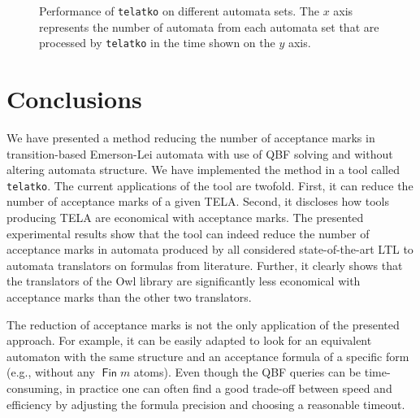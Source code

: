 \documentclass[a4paper,UKenglish,cleveref,autoref,thm-restate]{lipics-v2021}
\newcommand{\todo}[1]{\marginpar{\textcolor{red}{#1}}}
\DeclareMathOperator{\Fin}{\mathsf{Fin}}
\newcommand{\telatko}{\texttt{telatko}\xspace}
\begin{document}
\todo{popisek Fig. 3 neni hezky. Je to wall time nebo CPU time? Je to
  kumulovany cas nebo pro kazdy automat zvlast? Zmenit popisky os v
  obrazku?}
\begin{figure}[b!]
  \caption{Performance of \telatko on different automata sets. The $x$
    axis represents the number of automata from each automata
    set that are processed by \telatko in the time shown on the $y$
    axis.}
\label{fig:quantile}
\bigskip
\centering

\end{figure}





\section{Conclusions}\label{sec:conclusion}

We have presented a method reducing the number of acceptance marks in
transition-based Emerson-Lei automata with use of QBF solving and
without altering automata structure. We have implemented the method in
a tool called \texttt{telatko}. The current applications of the tool
are twofold. First, it can reduce the number of acceptance marks of a
given TELA. Second, it discloses how tools producing TELA are
economical with acceptance marks. The presented experimental results
show that the tool can indeed reduce the number of acceptance marks in
automata produced by all considered state-of-the-art LTL to automata
translators on formulas from literature. Further, it clearly shows
that the translators of the Owl library are significantly less
economical with acceptance marks than the other two translators.

The reduction of acceptance marks is not the only application of the
presented approach. For example, it can be easily adapted to look for
an equivalent automaton with the same structure and an acceptance
formula of a specific form (e.g., without any $\Fin m$ atoms). Even
though the QBF queries can be time-consuming, in practice one can
often find a good trade-off between speed and efficiency by adjusting 
the formula precision and choosing a reasonable timeout.
\end{document}
